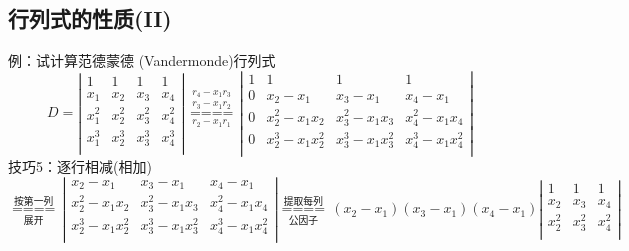 \subsection{行列式的性质(II)}
{\color{blue}例：}试计算范德蒙德 (Vandermonde)行列式
$$
D=\left| \begin{matrix}
    1 & 1 & 1 & 1  \\
    {{x}_{1}} & {{x}_{2}} & {{x}_{3}} & {{x}_{4}}  \\
    x_{1}^{2} & x_{2}^{2} & x_{3}^{2} & x_{4}^{2}  \\
    x_{1}^{3} & x_{2}^{3} & x_{3}^{3} & x_{4}^{3}  \\
 \end{matrix} \right|
 \underset{{{r}_{2}}-{{x}_{1}}{{r}_{1}}}{\overset{\begin{smallmatrix} 
    {{r}_{4}}-{{x}_{1}}{{r}_{3}} \\ 
    {{r}_{3}}-{{x}_{1}}{{r}_{2}} 
   \end{smallmatrix}}{\mathop{====}}}
\left| \begin{matrix}
    1 & 1 & 1 & 1  \\
    0 & {{x}_{2}}-{{x}_{1}} & {{x}_{3}}-{{x}_{1}} & {{x}_{4}}-{{x}_{1}}  \\
    0 & x_{2}^{2}-{{x}_{1}}{{x}_{2}} & x_{3}^{2}-{{x}_{1}}{{x}_{3}} & x_{4}^{2}-{{x}_{1}}{{x}_{4}}  \\
    0 & x_{2}^{3}-{{x}_{1}}x_{2}^{2} & x_{3}^{3}-{{x}_{1}}x_{3}^{2} & x_{4}^{3}-{{x}_{1}}x_{4}^{2}  \\
 \end{matrix} \right|
$$
{\color{blue}技巧5：}逐行相减(相加)
$$
\underset{\mbox{展开}}{\overset{\mbox{按第一列}}{\mathop{====}}}\,
\left| \begin{matrix}
    {{x}_{2}}-{{x}_{1}} & {{x}_{3}}-{{x}_{1}} & {{x}_{4}}-{{x}_{1}}  \\
    x_{2}^{2}-{{x}_{1}}{{x}_{2}} & x_{3}^{2}-{{x}_{1}}{{x}_{3}} & x_{4}^{2}-{{x}_{1}}{{x}_{4}}  \\
    x_{2}^{3}-{{x}_{1}}x_{2}^{2} & x_{3}^{3}-{{x}_{1}}x_{3}^{2} & x_{4}^{3}-{{x}_{1}}x_{4}^{2}  \\
 \end{matrix} \right|
\underset{\mbox{公因子}}{\overset{\mbox{提取每列}}{\mathop{====}}}\,
 ({{x}_{2}}-{{x}_{1}})({{x}_{3}}-{{x}_{1}})({{x}_{4}}-{{x}_{1}})\left| \begin{matrix}
    1 & 1 & 1  \\
    {{x}_{2}} & {{x}_{3}} & {{x}_{4}}  \\
    x_{2}^{2} & x_{3}^{2} & x_{4}^{2}  \\
 \end{matrix} \right|
$$
